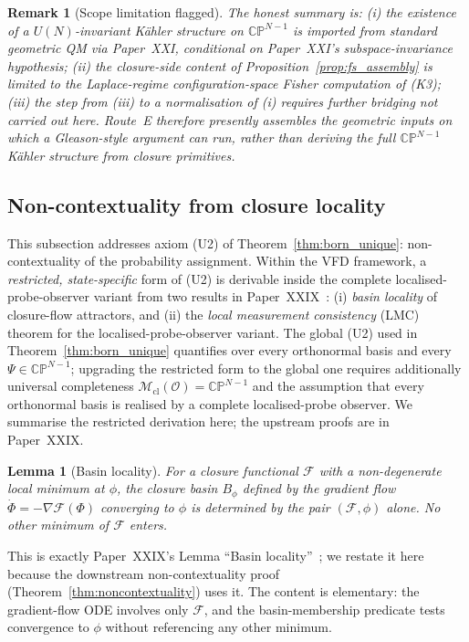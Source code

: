 \documentclass[12pt]{article}
\newtheorem{remark}[theorem]{Remark}
\newtheorem{lemma}[theorem]{Lemma}
\newcommand{\Fcal}{\mathcal{F}}
\newcommand{\Ocal}{\mathcal{O}}
\newcommand{\Mcl}{\mathcal{M}_{\mathrm{cl}}}
\begin{document}
\begin{remark}[Scope limitation flagged]\label{rem:global_gap}
The honest summary is: (i) the existence of a $U(N)$-invariant K\"ahler structure on $\mathbb{CP}^{N-1}$ is imported from standard geometric QM via Paper~XXI, conditional on Paper~XXI's subspace-invariance hypothesis; (ii) the closure-side content of Proposition~\ref{prop:fs_assembly} is limited to the Laplace-regime configuration-space Fisher computation of (K3); (iii) the step from (iii) to a normalisation of (i) requires further bridging not carried out here. Route~E therefore presently \emph{assembles} the geometric inputs on which a Gleason-style argument can run, rather than deriving the full $\mathbb{CP}^{N-1}$ K\"ahler structure from closure primitives.
\end{remark}

\subsection{Non-contextuality from closure locality}\label{subsec:noncontextuality}

This subsection addresses axiom (U2) of Theorem~\ref{thm:born_unique}: non-contextuality of the probability assignment. Within the VFD framework, a \emph{restricted, state-specific} form of (U2) is derivable inside the complete localised-probe-observer variant from two results in Paper~XXIX~\citep{SmartXXIX}: (i) \emph{basin locality} of closure-flow attractors, and (ii) the \emph{local measurement consistency} (LMC) theorem for the localised-probe-observer variant. The global (U2) used in Theorem~\ref{thm:born_unique} quantifies over every orthonormal basis and every $\Psi \in \mathbb{CP}^{N-1}$; upgrading the restricted form to the global one requires additionally universal completeness $\Mcl(\Ocal) = \mathbb{CP}^{N-1}$ and the assumption that every orthonormal basis is realised by a complete localised-probe observer. We summarise the restricted derivation here; the upstream proofs are in Paper~XXIX.

\begin{lemma}[Basin locality]\label{lem:basin_locality}
For a closure functional $\Fcal$ with a non-degenerate local minimum at $\phi$, the closure basin $B_\phi$ defined by the gradient flow $\dot\Phi = -\nabla\Fcal(\Phi)$ converging to $\phi$ is determined by the pair $(\Fcal, \phi)$ alone. No other minimum of $\Fcal$ enters.
\end{lemma}

This is exactly Paper~XXIX's Lemma ``Basin locality''~\citep{SmartXXIX}; we restate it here because the downstream non-contextuality proof (Theorem~\ref{thm:noncontextuality}) uses it. The content is elementary: the gradient-flow ODE involves only $\Fcal$, and the basin-membership predicate tests convergence to $\phi$ without referencing any other minimum.
\end{document}
